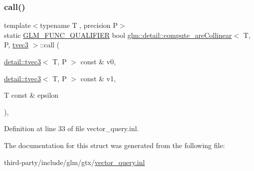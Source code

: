\subsubsection{\texorpdfstring{call()}{call()}}
{\footnotesize\ttfamily template$<$typename T , precision P$>$ \\
static \hyperlink{setup_8hpp_a33fdea6f91c5f834105f7415e2a64407}{G\+L\+M\+\_\+\+F\+U\+N\+C\+\_\+\+Q\+U\+A\+L\+I\+F\+I\+ER} bool \hyperlink{structglm_1_1detail_1_1compute__are_collinear}{glm\+::detail\+::compute\+\_\+are\+Collinear}$<$ T, P, \hyperlink{structglm_1_1detail_1_1tvec3}{tvec3} $>$\+::call (\begin{DoxyParamCaption}\item[{\hyperlink{structglm_1_1detail_1_1tvec3}{detail\+::tvec3}$<$ T, P $>$ const \&}]{v0,  }\item[{\hyperlink{structglm_1_1detail_1_1tvec3}{detail\+::tvec3}$<$ T, P $>$ const \&}]{v1,  }\item[{T const \&}]{epsilon }\end{DoxyParamCaption})\hspace{0.3cm}{\ttfamily [inline]}, {\ttfamily [static]}}



Definition at line 33 of file vector\+\_\+query.\+inl.



The documentation for this struct was generated from the following file\+:\begin{DoxyCompactItemize}
\item 
third-\/party/include/glm/gtx/\hyperlink{vector__query_8inl}{vector\+\_\+query.\+inl}\end{DoxyCompactItemize}
